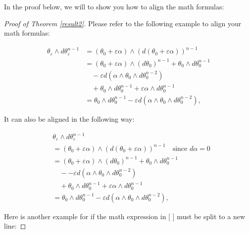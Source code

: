\documentclass{main}
\begin{document}
In the proof below, we will to show you how to align the math formulas:
\begin{proof}[Proof of Theorem \ref{result2}]
Please refer to the following example to align your math formulas:

\begin{equation}\label{Eqn2}
  \begin{split}
    \theta_\varepsilon  \wedge d\theta_\varepsilon ^{n-1}
    & = (\theta_0 + \varepsilon \alpha) \wedge (d(\theta_0 + \varepsilon \alpha))^{n-1}
       \\
    & = (\theta_0 + \varepsilon \alpha) \wedge (d\theta_0)^{n-1} + \theta_0 \wedge d\theta_0^{n-1}
   \\
    &\quad - \varepsilon d(\alpha \wedge \theta_0 \wedge d\theta_0^{n-2}) \\
    & \quad  + \theta_0 \wedge d\theta_0^{n-1} + \varepsilon \alpha \wedge d\theta_0^{n-1}  \\
    & = \theta_0 \wedge d\theta_0^{n-1}
      - \varepsilon d(\alpha \wedge \theta_0 \wedge d\theta_0^{n-2}),
  \end{split}
\end{equation}


It can also be aligned in the following way:

\begin{equation}\label{Eqn3}
  \begin{split}
    & \theta_\varepsilon  \wedge d\theta_\varepsilon ^{n-1} \\
    & = (\theta_0 + \varepsilon \alpha) \wedge (d(\theta_0 + \varepsilon \alpha))^{n-1}
      \quad \text{since } d\alpha = 0 \\
    & = (\theta_0 + \varepsilon \alpha) \wedge (d\theta_0)^{n-1} + \theta_0 \wedge d\theta_0^{n-1}
     \\
    &\quad - - \varepsilon d(\alpha \wedge \theta_0 \wedge d\theta_0^{n-2}) \\
    & \quad + \theta_0 \wedge d\theta_0^{n-1} + \varepsilon \alpha \wedge d\theta_0^{n-1} \\
    & = \theta_0 \wedge d\theta_0^{n-1}
      - \varepsilon d(\alpha \wedge \theta_0 \wedge d\theta_0^{n-2}),
  \end{split}
\end{equation}


Here is another example for if the math expression in [ ] must be split to a new line:


\end{proof}
\end{document}
